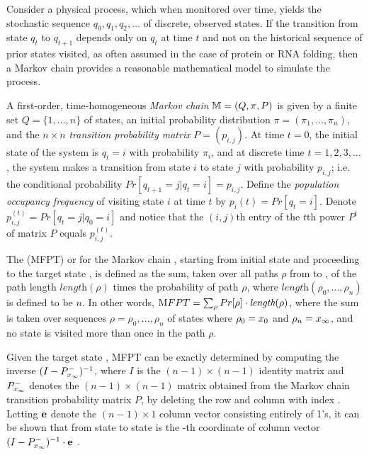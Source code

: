 \documentclass[11pt, oneside]{Thesis} %
\begin{document}
Consider a physical process,
which when monitored over time, yields the stochastic sequence
$q_0,q_1,q_2,\dots$ of discrete, observed states. If the transition from
state $q_t$ to $q_{t+1}$ depends only on $q_t$ at time
$t$ and not on the historical sequence of prior states visited,
as often assumed in the case of protein or
RNA folding, then a Markov chain provides a reasonable
mathematical model to simulate the process.

A first-order, time-homogeneous
{\em Markov chain} $\mathbb{M} = (Q,\pi,P)$ is given by a finite
set $Q = \{ 1,\dots,n \}$ of states, an initial probability distribution
$\pi = (\pi_1,\dots,\pi_n)$, and the $n \times n$
{\em transition probability matrix} $P = (p_{i,j})$.
At time $t=0$, the initial state of the system is
$q_t=i$ with probability $\pi_i$, and at discrete time
$t=1,2,3,\dots$, the system makes a transition from state
$i$ to state $j$ with probability $p_{i,j}$; i.e.
the conditional probability $Pr[ q_{t+1} = j | q_t=i] = p_{i,j}$.
Define the {\em population occupancy frequency} of visiting state
$i$ at time $t$ by $p_{i}(t) = Pr[q_t=i]$.  Denote
$p_{i,j}^{(t)} = Pr[q_t = j | q_0 = i]$ and notice that
the $(i,j)$th entry of the $t$th power $P^t$ of matrix $P$  equals
$p_{i,j}^{(t)}$.

The {\em \mfpt} (MFPT) or
{\em \hit} for the Markov chain \mChain,
starting from initial state \xStart and proceeding
to the target state \xEnd, is defined
as the sum, taken over all paths $\rho$
from \xStart to \xEnd, of the path length $\textit{length}(\rho)$
times the probability
of path $\rho$, where $\textit{length}(\rho_0,\dots,\rho_n)$ is defined to
be $n$. In other words,
${\text MFPT} = \sum_{\rho} Pr[\rho] \cdot \textit{length}(\rho)$, where
the sum is taken over sequences $\rho=\rho_0,\dots,\rho_n$ of states
where $\rho_0=x_0$ and $\rho_n=x_\infty$, and no state is visited more
than once in the path $\rho$.

Given the target state \xEnd, MFPT can be exactly
determined by computing the inverse
$(I - P^{-}_{x_\infty})^{-1}$, where $I$ is the $(n-1)\times (n-1)$ identity
matrix and $P^{-}_{x_\infty}$
denotes the $(n-1)\times (n-1)$ matrix obtained from the
Markov chain transition probability matrix $P$,
by deleting the row and column with index \xEnd.
Letting ${\bf e}$ denote the
$(n-1) \times 1$ column vector consisting entirely of 1's, it can be
shown that \mfpt from state \xStart to state \xEnd
is the \xStart-th coordinate
of column vector
$(I - P^{-}_{x_\infty})^{-1} \cdot {\bf e}$ \citep{meyermfpt}.
\end{document}
